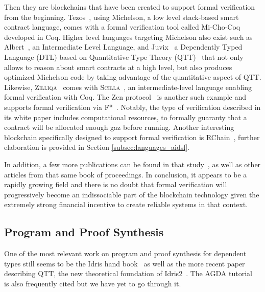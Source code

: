 \documentclass[]{report}
\begin{document}
Then they are blockchains that have been created to support formal
verification from the beginning.  Tezos~\cite{Tezos2014}, using
Michelson, a low level stack-based smart contract language, comes with
a formal verification tool called Mi-Cho-Coq~\cite{Bernardo2019}
developed in Coq.  Higher level languages targeting Michelson also
exist such as Albert~\cite{Bernardo2020}, an Intermediate Level
Language, and Juvix~\cite{Goes2020} a Dependently Typed Language (DTL)
based on Quantitative Type Theory (QTT)~\cite{Atkey2018} that not only
allows to reason about smart contracts at a high level, but also
produces optimized Michelson code by taking advantage of the
quantitative aspect of QTT.  Likewise,
\textsc{Zilliqa}~\cite{Zilliqa2017} comes with
\textsc{Scilla}~\cite{Ilya2018}, an intermediate-level language
enabling formal verification with Coq.  The Zen
protocol~\cite{Zen2017} is another such example and supports formal
verification via F*~\cite{Swamy2013}.  Notably, the type of
verification described in its white paper includes computational
resources, to formally guaranty that a contract will be allocated
enough gaz before running.  Another interesting blockchain
specifically designed to support formal verification is
RChain~\cite{RChain2021}, further elaboration is provided in Section
\ref{subsec:languages_aidsl}.

In addition, a few more publications can be found in that
study~\cite{Pace2020}, as well as other articles from that same book
of proceedings. In conclusion, it appears to be a rapidly growing
field and there is no doubt that formal verification will
progressively become an indissociable part of the blockchain
technology given the extremely strong financial incentive to create
reliable systems in that context.

\subsection{Program and Proof Synthesis}

One of the most relevant work on program and proof synthesis for
dependent types still seems to be the Idris hand book~\cite{Brady2017}
as well as the more recent paper describing QTT, the new theoretical
foundation of Idris2~\cite{Brady2021}.  The AGDA
tutorial~\cite{Norell2009} is also frequently cited but we have yet to
go through it.
\end{document}
